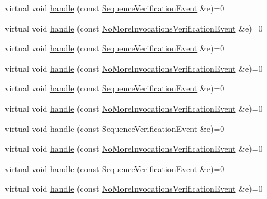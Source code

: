 \begin{DoxyCompactItemize}
virtual void \mbox{\hyperlink{structfakeit_1_1EventHandler_adf355a9888bc2bf78ce0e1219bfb1379}{handle}} (const \mbox{\hyperlink{structfakeit_1_1SequenceVerificationEvent}{Sequence\+Verification\+Event}} \&e)=0
\item 
virtual void \mbox{\hyperlink{structfakeit_1_1EventHandler_a826b9d15e23bad7013b219d8e45ef1d0}{handle}} (const \mbox{\hyperlink{structfakeit_1_1NoMoreInvocationsVerificationEvent}{No\+More\+Invocations\+Verification\+Event}} \&e)=0
\item 
virtual void \mbox{\hyperlink{structfakeit_1_1EventHandler_adf355a9888bc2bf78ce0e1219bfb1379}{handle}} (const \mbox{\hyperlink{structfakeit_1_1SequenceVerificationEvent}{Sequence\+Verification\+Event}} \&e)=0
\item 
virtual void \mbox{\hyperlink{structfakeit_1_1EventHandler_a826b9d15e23bad7013b219d8e45ef1d0}{handle}} (const \mbox{\hyperlink{structfakeit_1_1NoMoreInvocationsVerificationEvent}{No\+More\+Invocations\+Verification\+Event}} \&e)=0
\item 
virtual void \mbox{\hyperlink{structfakeit_1_1EventHandler_adf355a9888bc2bf78ce0e1219bfb1379}{handle}} (const \mbox{\hyperlink{structfakeit_1_1SequenceVerificationEvent}{Sequence\+Verification\+Event}} \&e)=0
\item 
virtual void \mbox{\hyperlink{structfakeit_1_1EventHandler_a826b9d15e23bad7013b219d8e45ef1d0}{handle}} (const \mbox{\hyperlink{structfakeit_1_1NoMoreInvocationsVerificationEvent}{No\+More\+Invocations\+Verification\+Event}} \&e)=0
\item 
virtual void \mbox{\hyperlink{structfakeit_1_1EventHandler_adf355a9888bc2bf78ce0e1219bfb1379}{handle}} (const \mbox{\hyperlink{structfakeit_1_1SequenceVerificationEvent}{Sequence\+Verification\+Event}} \&e)=0
\item 
virtual void \mbox{\hyperlink{structfakeit_1_1EventHandler_a826b9d15e23bad7013b219d8e45ef1d0}{handle}} (const \mbox{\hyperlink{structfakeit_1_1NoMoreInvocationsVerificationEvent}{No\+More\+Invocations\+Verification\+Event}} \&e)=0
\item 
virtual void \mbox{\hyperlink{structfakeit_1_1EventHandler_adf355a9888bc2bf78ce0e1219bfb1379}{handle}} (const \mbox{\hyperlink{structfakeit_1_1SequenceVerificationEvent}{Sequence\+Verification\+Event}} \&e)=0
\item 
virtual void \mbox{\hyperlink{structfakeit_1_1EventHandler_a826b9d15e23bad7013b219d8e45ef1d0}{handle}} (const \mbox{\hyperlink{structfakeit_1_1NoMoreInvocationsVerificationEvent}{No\+More\+Invocations\+Verification\+Event}} \&e)=0

\end{DoxyCompactItemize}
